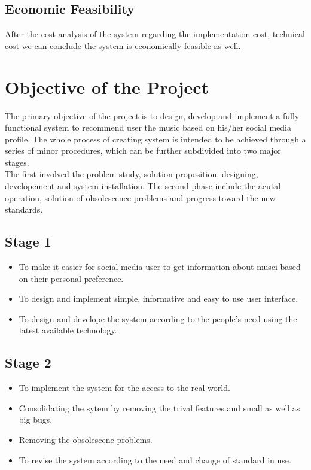 \documentclass[a4paper,12pt]{article}
\begin{document}
	\subsection{Economic Feasibility}
	After the cost analysis of the system regarding the implementation cost, technical cost we can conclude the system is economically feasible as well.
\cleardoublepage

\section{Objective of the Project}
The primary objective of the project is to design, develop and implement a fully functional system to recommend user the music based on his/her social media profile. The whole process of creating system is intended to be achieved through a series of minor procedures, which can be further subdivided into two major stages.\\
The first involved the problem study, solution proposition, designing, developement and system installation. The second phase include the acutal operation, solution of obsolescence problems and progress toward the new standards.\subsection{Stage 1}
\begin{itemize}
	\item To make it easier for social media user to get information about musci based on their personal preference.
	\item To design and implement simple, informative and easy to use user interface.
	\item To design and develope the system according to the people's need using the latest available technology.
\end{itemize}
\subsection{Stage 2}
\begin{itemize}
	\item To implement the system for the access to the real world.
	\item Consolidating the sytem by removing the trival features and small as well as big bugs.
	\item Removing the obsolescene problems.
	\item To revise the system according to the need and change of standard in use.
\end{itemize}
\end{document}
